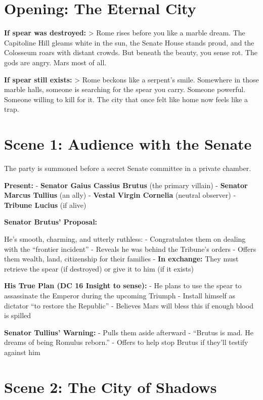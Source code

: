 \documentclass[
]{book}
\begin{document}
\section{Opening: The Eternal City}\label{opening-the-eternal-city}

\textbf{If spear was destroyed:} \textgreater{} Rome rises before you
like a marble dream. The Capitoline Hill gleams white in the sun, the
Senate House stands proud, and the Colosseum roars with distant crowds.
But beneath the beauty, you sense rot. The gods are angry. Mars most of
all.

\textbf{If spear still exists:} \textgreater{} Rome beckons like a
serpent's smile. Somewhere in those marble halls, someone is searching
for the spear you carry. Someone powerful. Someone willing to kill for
it. The city that once felt like home now feels like a trap.

\section{Scene 1: Audience with the
Senate}\label{scene-1-audience-with-the-senate}

The party is summoned before a secret Senate committee in a private
chamber.

\textbf{Present:} - \textbf{Senator Gaius Cassius Brutus} (the primary
villain) - \textbf{Senator Marcus Tullius} (an ally) - \textbf{Vestal
Virgin Cornelia} (neutral observer) - \textbf{Tribune Lucius} (if alive)

\textbf{Senator Brutus' Proposal:}

He's smooth, charming, and utterly ruthless: - Congratulates them on
dealing with the ``frontier incident'' - Reveals he was behind the
Tribune's orders - Offers them wealth, land, citizenship for their
families - \textbf{In exchange:} They must retrieve the spear (if
destroyed) or give it to him (if it exists)

\textbf{His True Plan (DC 16 Insight to sense):} - He plans to use the
spear to assassinate the Emperor during the upcoming Triumph - Install
himself as dictator ``to restore the Republic'' - Believes Mars will
bless this if enough blood is spilled

\textbf{Senator Tullius' Warning:} - Pulls them aside afterward -
``Brutus is mad. He dreams of being Romulus reborn.'' - Offers to help
stop Brutus if they'll testify against him

\section{Scene 2: The City of
Shadows}\label{scene-2-the-city-of-shadows}
\end{document}
